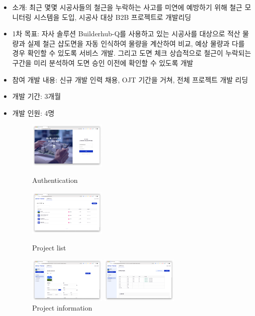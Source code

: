 \begin{itemize}[label=]
	\item 소개: 최근 몇몇 시공사들의 철근을 누락하는 사고를 미연에 예방하기 위해 철근 모니터링 시스템을 도입, 시공사 대상 B2B 프로젝트로 개발리딩
	\item 1차 목표: 자사 솔루션 Builderhub-Q를 사용하고 있는 시공사를 대상으로 적산 물량과 실제 철근 샵도면을 자동 인식하여 물량을 계산하여 비교, 예상 물량과 다를 경우 확인할 수 있도록 서비스 개발. 그리고 도면 체크 상습적으로 철근이 누락되는 구간을 미리 분석하여 도면 승인 이전에 확인할 수 있도록 개발
	\item 참여 개발 내용: 신규 개발 인력 채용, OJT 기간을 거쳐, 전체 프로젝트 개발 리딩
	\item 개발 기간: 3개월
	\item 개발 인원: 4명
	      \begin{figure}[!ht]
		      \begin{fullwidth}
			      \parbox{0.35\textwidth}{
				      \centering
				      \includegraphics[width=0.35\textwidth]{images/smart-checker-auth.png}
				      \caption*{Authentication}
			      }\qquad
			      \parbox{0.35\textwidth}{
				      \centering
				      \includegraphics[width=0.35\textwidth]{images/smart-checker-project-list.png}
				      \caption*{Project list}
			      }\qquad
			      \parbox{0.35\textwidth}{
				      \centering
				      \includegraphics[width=0.35\textwidth]{images/smart-checker-project-info.png}
				      \caption*{Project information}
			      }\qquad
			      \parbox{0.35\textwidth}{
				      \centering
				      \includegraphics[width=0.35\textwidth]{images/smart-checker-csv-upload.png}
}
\end{fullwidth}
\end{figure}
\end{itemize}
